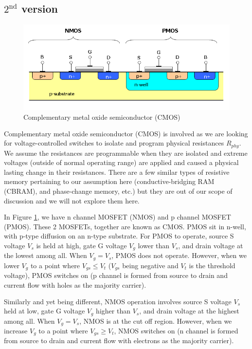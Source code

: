 \subsection{$\text{2}^{\text{nd}}$ version} %
\begin{figure}[H]
	\centering
	\includegraphics[scale=0.5]{cmos.png}
	\caption{Complementary metal oxide semiconductor (CMOS)}
	\label{fig:cmos}
\end{figure}
Complementary metal oxide semiconductor (CMOS) is involved as we are looking for voltage-controlled switches to isolate and program physical resistances $R_{phy}$. We assume the resistances are programmable when they are isolated and extreme voltages (outside of normal operating range) are applied and caused a physical lasting change in their resistances. There are a few similar types of resistive memory pertaining to our assumption here (conductive-bridging RAM (CBRAM), and phase-change memory, etc.) but they are out of our scope of discussion and we will not explore them here.

In Figure \ref{fig:cmos}, we have n channel MOSFET (NMOS) and p channel MOSFET (PMOS). These 2 MOSFETs, together are known as CMOS. PMOS sit in n-well, with p-type diffusion on an n-type substrate.
For PMOS to operate, source S voltage $V_s$ is held at high, gate G voltage $V_g$ lower than $V_s$, and drain voltage at the lowest among all. When $V_g=V_s$, PMOS does not operate. However, when we lower $V_g$ to a point where $V_{gs} \leq V_t$ ($V_{gs}$ being negative and $V_t$ is the threshold voltage), PMOS switches on (p channel is formed from source to drain and current flow with holes as the majority carrier).

Similarly and yet being different, NMOS operation involves source S voltage $V_s$ held at low, gate G voltage $V_g$ higher than $V_s$, and drain voltage at the highest among all. When $V_g=V_s$, NMOS is at the cut off region. However, when we increase $V_g$ to a point where $V_{gs} \geq V_t$, NMOS switches on (n channel is formed from source to drain and current flow with electrons as the majority carrier).

